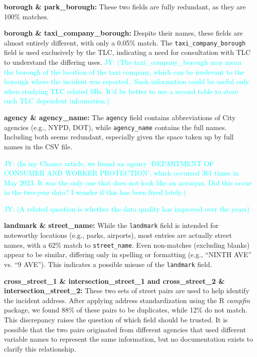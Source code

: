 \documentclass[linenumber]{jdsart}
\newcommand{\jy}[1]{\textcolor{cyan}{JY: (#1)}}
\begin{document}
\textbf{borough \& park\_borough:} These two fields are fully redundant, 
as they are 100\% matches.

\textbf{borough \& taxi\_company\_borough:} Despite their names, these 
fields are almost entirely different, with only a 0.05\% match. The 
\texttt{taxi\_company\_borough} field is used exclusively by the TLC, 
indicating a need for consultation with TLC to understand the differing 
uses.
\jy{The taxi\_company\_borough may mean the borough of the location of
  the taxi company, which can be irrelevant to the borough where the
  incident was reported.. Such information could be useful only when
  studying TLC related SRs. It'd be better to use a second table to
  store such TLC dependent information.}

\textbf{agency \& agency\_name:} The \texttt{agency} field contains 
abbreviations of City agencies (e.g., NYPD, DOT), while 
\texttt{agency\_name} contains the full names. Including both seems 
redundant, especially given the space taken up by full names in the 
CSV file.

\jy{In my Chance article, we found an agency
  `DEPARTMENT OF CONSUMER AND WORKER PROTECTION', which occurred 361
  times in May 2023. It was the only one that does not look like an
  acronym. Did this occur in the two-year data?
  I wonder if this has been fixed lately.}

\jy{A related question is whether the data quality has improved over
  the years}
  

\textbf{landmark \& street\_name:} While the \texttt{landmark} field is 
intended for noteworthy locations (e.g., parks, airports), most entries 
are actually street names, with a 62\% match to \texttt{street\_name}. 
Even non-matches (excluding blanks) appear to be similar, differing 
only in spelling or formatting (e.g., ``NINTH AVE'' vs. ``9 AVE''). This 
indicates a possible misuse of the \texttt{landmark} field.

\textbf{cross\_street\_1 \& intersection\_street\_1 and cross\_street\_2 
\& intersection\_street\_2:} These two sets of street pairs are used to 
help identify the incident address. After applying address 
standardization using the R \textit{campfin} package, we found 88\% of 
these pairs to be duplicates, while 12\% do not match. This discrepancy 
raises the question of which field should be trusted. It is possible 
that the two pairs originated from different agencies that used 
different variable names to represent the same information, but no 
documentation exists to clarify this relationship.
\end{document}
